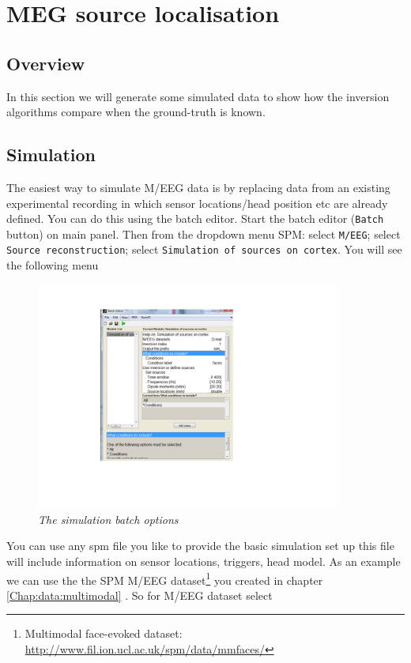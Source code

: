 \chapter{MEG source localisation\label{Chap:data:sloc}}


\section{Overview}
In this section we will generate some simulated data to show how the inversion algorithms compare when the ground-truth is known. 

\section{Simulation}
The easiest way to simulate M/EEG data is by replacing data from an existing experimental recording in which sensor locations/head position etc are already defined. You can do this using the batch editor. Start the batch editor (\texttt{Batch} button) on main panel. Then from the dropdown menu SPM: select \texttt{M/EEG}; select \texttt{Source reconstruction}; select \texttt{Simulation of sources on cortex}.
You will see the following menu

\begin{figure}
\begin{center}
\includegraphics[width=100mm]{meg_sloc/slide1}
\caption{\em The simulation batch options} \label{meg_sloc:fig:1}
\end{center}
\end{figure}

You can use any spm file you like to provide the basic simulation set up this file will include information on sensor locations, triggers, head model. As an example we can use the the SPM M/EEG dataset\footnote{Multimodal face-evoked dataset: \url{http://www.fil.ion.ucl.ac.uk/spm/data/mmfaces/}} you created in chapter \ref{Chap:data:multimodal} . So for M/EEG dataset select 

